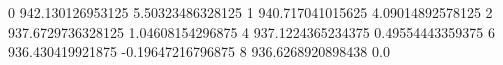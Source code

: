 0 942.130126953125 5.50323486328125
1 940.717041015625 4.09014892578125
2 937.6729736328125 1.04608154296875
4 937.1224365234375 0.49554443359375
6 936.430419921875 -0.19647216796875
8 936.6268920898438 0.0
